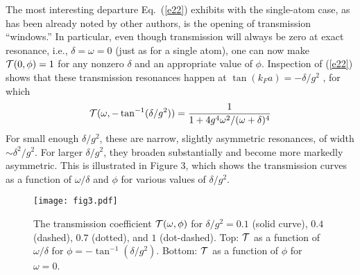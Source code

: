 \documentclass[aps,pra,twocolumn,floatfix,superscriptaddress]{revtex4}
\begin{document}
The most interesting departure Eq.~(\ref{e22}) exhibits with the single-atom case, as has been already noted by other authors, is the opening of transmission ``windows.'' In particular, even though transmission will always be zero at exact resonance, i.e., $\delta =\omega=0$ (just as for a single atom), one can now make ${\cal T}(0,\phi)=1$ for any nonzero $\delta$ and an appropriate value of $\phi$.  Inspection of (\ref{e22}) shows that these transmission resonances happen at $\tan(k_F a) = -\delta/g^2$ \cite{zheng2,tsoilaw,zubairy2}, for which 
\begin{equation}
{\cal T}(\omega,-\tan^{-1}(\delta/g^2)) = \frac{1}{1+4g^4\omega^2/(\omega+\delta)^4}
\label{e23}
\end{equation}
For small enough $\delta/g^2$, these are narrow, slightly asymmetric resonances, of width $\sim \delta^2/g^2$.  For larger $\delta/g^2$, they broaden substantially and become more markedly asymmetric.  This is illustrated in Figure 3, which shows the transmission curves as a function of $\omega/\delta$ and $\phi$ for various values of $\delta/g^2$.

\begin{figure}
\texttt{[image: fig3.pdf]}
\caption{\label{fig3} The transmission coefficient ${\cal T}(\omega,\phi)$ for $\delta/g^2 = 0.1$ (solid curve), $0.4$ (dashed), $0.7$ (dotted), and $1$ (dot-dashed).  Top: ${\cal T}$ as a function of $\omega/\delta$ for $\phi = -\tan^{-1}(\delta/g^2)$.  Bottom: ${\cal T}$ as a function of $\phi$ for $\omega=0$. }
\end{figure}
\end{document}
